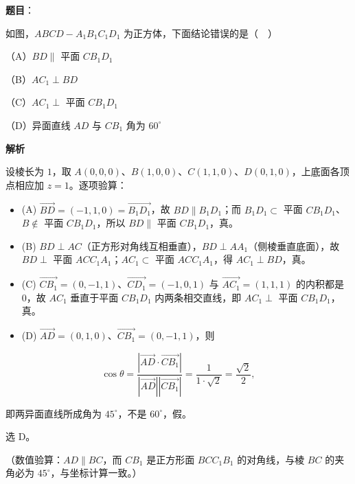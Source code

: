 \begin{answer}

\textbf{题目}：

如图，$ABCD-A_1B_1C_1D_1$ 为正方体，下面结论错误的是（　）
\nopagebreak[4]
\begin{center}\end{center}
\nopagebreak[4]
（A）$BD\parallel$ 平面 $CB_1D_1$

（B）$AC_1\perp BD$

（C）$AC_1\perp$ 平面 $CB_1D_1$

（D）异面直线 $AD$ 与 $CB_1$ 角为 $60^\circ$

\textbf{解析}

设棱长为 $1$，取 $A(0,0,0)$、$B(1,0,0)$、$C(1,1,0)$、$D(0,1,0)$，上底面各顶点相应加 $z=1$。逐项验算：

\begin{itemize}
\item (A) $\overrightarrow{BD}=(-1,1,0)=\overrightarrow{B_1D_1}$，故 $BD\parallel B_1D_1$；而 $B_1D_1\subset$ 平面 $CB_1D_1$、$B\notin$ 平面 $CB_1D_1$，所以 $BD\parallel$ 平面 $CB_1D_1$，真。
\item (B) $BD\perp AC$（正方形对角线互相垂直），$BD\perp AA_1$（侧棱垂直底面），故 $BD\perp$ 平面 $ACC_1A_1$；$AC_1\subset$ 平面 $ACC_1A_1$，得 $AC_1\perp BD$，真。
\item (C) $\overrightarrow{CB_1}=(0,-1,1)$、$\overrightarrow{CD_1}=(-1,0,1)$ 与 $\overrightarrow{AC_1}=(1,1,1)$ 的内积都是 $0$，故 $AC_1$ 垂直于平面 $CB_1D_1$ 内两条相交直线，即 $AC_1\perp$ 平面 $CB_1D_1$，真。
\item (D) $\overrightarrow{AD}=(0,1,0)$、$\overrightarrow{CB_1}=(0,-1,1)$，则
\end{itemize}

\nopagebreak[4]
\[\cos\theta=\frac{\left|\overrightarrow{AD}\cdot\overrightarrow{CB_1}\right|}{\left|\overrightarrow{AD}\right|\left|\overrightarrow{CB_1}\right|}=\frac{1}{1\cdot\sqrt2}=\frac{\sqrt2}{2},\]

即两异面直线所成角为 $45^\circ$，不是 $60^\circ$，假。

选 D。

（数值验算：$AD\parallel BC$，而 $CB_1$ 是正方形面 $BCC_1B_1$ 的对角线，与棱 $BC$ 的夹角必为 $45^\circ$，与坐标计算一致。）


\end{answer}
